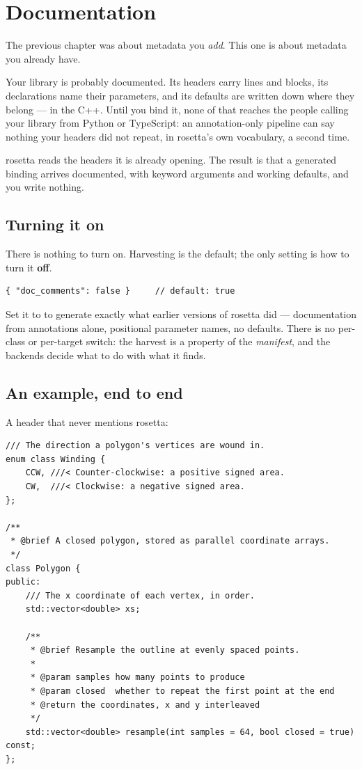 \chapter{Documentation}
\label{ch:documentation}

The previous chapter was about metadata you \emph{add}. This one is about
metadata you already have.

Your library is probably documented. Its headers carry \code{///} lines and
 blocks, its declarations name their parameters, and
its defaults are written down where they belong --- in the C++. Until you bind
it, none of that reaches the people calling your library from Python or
TypeScript: an annotation-only pipeline can say nothing your headers did not
repeat, in rosetta's own vocabulary, a second time.

rosetta reads the headers it is already opening. The result is that a generated
binding arrives documented, with keyword arguments and working defaults, and
you write nothing.

\section{Turning it on}

There is nothing to turn on. Harvesting is the default; the only setting is how
to turn it \textbf{off}.

\begin{lstlisting}[style=json]
{ "doc_comments": false }     // default: true
\end{lstlisting}

Set it to  to generate exactly what earlier versions of rosetta did
--- documentation from annotations alone, positional parameter names, no
defaults. There is no per-class or per-target switch: the harvest is a property
of the \emph{manifest}, and the backends decide what to do with what it finds.

\section{An example, end to end}

A header that never mentions rosetta:

\begin{lstlisting}[style=cpp]
/// The direction a polygon's vertices are wound in.
enum class Winding {
    CCW, ///< Counter-clockwise: a positive signed area.
    CW,  ///< Clockwise: a negative signed area.
};

/**
 * @brief A closed polygon, stored as parallel coordinate arrays.
 */
class Polygon {
public:
    /// The x coordinate of each vertex, in order.
    std::vector<double> xs;

    /**
     * @brief Resample the outline at evenly spaced points.
     *
     * @param samples how many points to produce
     * @param closed  whether to repeat the first point at the end
     * @return the coordinates, x and y interleaved
     */
    std::vector<double> resample(int samples = 64, bool closed = true) const;
};
\end{lstlisting}

